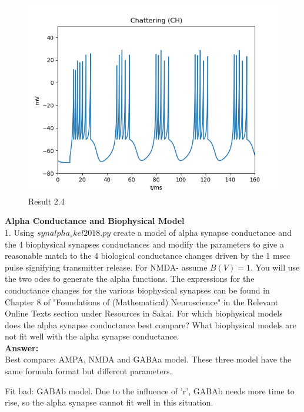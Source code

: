 \documentclass[12pt]{article}
\begin{document}
 \begin{figure}[H]
  \centering
   \includegraphics[width=.8\textwidth]{h2_p2_CH.png} %
         \caption{Result 2.4}
  \label{img} %
\end{figure}
\newpage
\textbf{Alpha Conductance and Biophysical Model }
\\

1.  Using $synalpha_skel2018.py$ create a model of alpha synapse conductance and the 4 biophysical synapses conductances and modify the parameters to give a reasonable match to the 4 biological conductance changes driven by the 1 msec pulse signifying transmitter release. For NMDA- assume $B(V)= 1$. You will use the two odes to generate the alpha functions. The expressions for the conductance changes for the various biophysical synapses can be found in Chapter 8 of "Foundations of (Mathematical) Neuroscience" in the Relevant Online Texts section under Resources in Sakai. For which biophysical models does the alpha synapse conductance best compare? What biophysical models are not fit well with the alpha synapse conductance. 
\\

\textbf{Answer:} 
\\

Best compare:
AMPA, NMDA and GABAa model. These three model have the same formula format but different parameters.

Fit bad:
GABAb model. Due to the influence of 'r', GABAb needs more time to rise, so the alpha synapse cannot fit well in this situation. 
\end{document}
